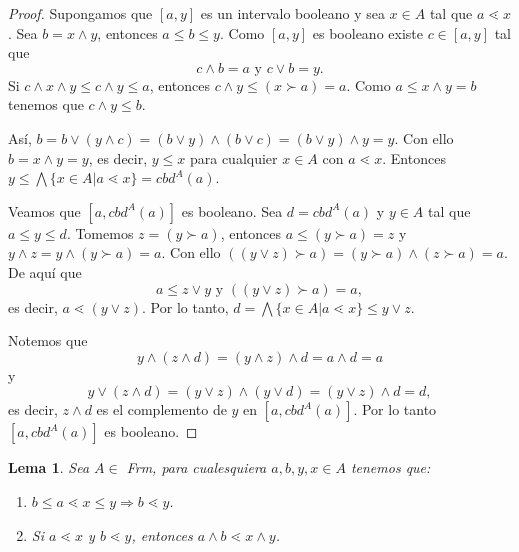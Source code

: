 \documentclass[12pt,letterpaper,titlepage]{article}
\newtheorem{lemma}{Lema}
\theoremstyle{definition}
\newcommand\<{\langle}
\renewcommand\>{\rangle}
\begin{document}
\begin{proof}
Supongamos que $[a,y]$ es un intervalo booleano y sea $x\in A$ tal que $a\lessdot x$. Sea $b=x\wedge y$, entonces $a\leq b\leq y$. Como $[a,y]$ es booleano existe $c\in [a, y]$ tal que $$c\wedge b=a\mbox{  y  }c\vee b=y.$$
Si $c\wedge x\wedge y\leq c\wedge y\leq a$, entonces $c\wedge y\leq (x\succ a)=a$. Como $a\leq x\wedge y=b$ tenemos que $c\wedge y\leq b$.

\noindent
Así, $b=b\vee (y\wedge c)=(b\vee y)\wedge(b\vee c)=(b\vee y)\wedge y=y$. Con ello $b=x\wedge y=y$, es decir, $y\leq x$ para cualquier $x\in A$ con $a\lessdot x$. Entonces $y\leq \bigwedge\{x\in A|a\lessdot x\}=cbd^A(a)$.

\noindent
Veamos que $[a, cbd^A(a)]$ es booleano. Sea $d=cbd^A(a)$ y $y\in A$ tal que $a\leq y \leq d$. Tomemos $z=(y\succ a)$, entonces $a\leq (y\succ a)=z$ y $y\wedge z=y\wedge (y\succ a)=a$. Con ello $((y\vee z)\succ a)=(y\succ a)\wedge(z\succ a)=a$. De aquí que $$a\leq z\vee y\mbox{ y }((y\vee z)\succ a)=a,$$ 
es decir, $a\lessdot (y\vee z)$. Por lo tanto, $d=\bigwedge\{x\in A|a\lessdot x\}\leq y\vee z$.

\noindent
Notemos que $$y\wedge(z\wedge d)=(y\wedge z)\wedge d=a\wedge d=a$$ y $$y\vee (z\wedge d)=(y\vee z)\wedge (y\vee d)=(y\vee z)\wedge d=d,$$ 
es decir, $z\wedge d$ es el complemento de $y$ en $[a,cbd^A(a)]$. Por lo tanto $[a,cbd^A(a)]$ es booleano. 
\end{proof}

\begin{lemma}
Sea $A\in$ \textit{Frm}, para cualesquiera $a,b,y,x\in A$ tenemos que:
\begin{enumerate}
\item $b\leq a\lessdot x\leq y\Rightarrow b\lessdot y$.
\item Si $a\lessdot x$ y $b\lessdot y$, entonces $a\wedge b\lessdot x\wedge y$.
\end{enumerate}
\end{lemma}
\end{document}
